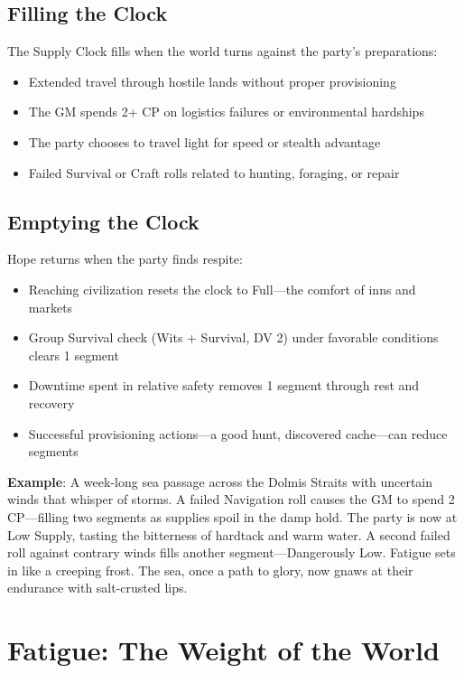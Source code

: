 \subsection*{Filling the Clock}

The Supply Clock fills when the world turns against the party's preparations:

\begin{itemize}
    \item Extended travel through hostile lands without proper provisioning
    \item The GM spends 2+ CP on logistics failures or environmental hardships
    \item The party chooses to travel light for speed or stealth advantage
    \item Failed Survival or Craft rolls related to hunting, foraging, or repair
\end{itemize}

\subsection*{Emptying the Clock}

Hope returns when the party finds respite:

\begin{itemize}
    \item Reaching civilization resets the clock to Full—the comfort of inns and markets
    \item Group Survival check (Wits + Survival, DV 2) under favorable conditions clears 1 segment
    \item Downtime spent in relative safety removes 1 segment through rest and recovery
    \item Successful provisioning actions—a good hunt, discovered cache—can reduce segments
\end{itemize}

\textbf{Example}: A week-long sea passage across the Dolmis Straits with uncertain winds that whisper of storms. A failed Navigation roll causes the GM to spend 2 CP---filling two segments as supplies spoil in the damp hold. The party is now at Low Supply, tasting the bitterness of hardtack and warm water. A second failed roll against contrary winds fills another segment---Dangerously Low. Fatigue sets in like a creeping frost. The sea, once a path to glory, now gnaws at their endurance with salt-crusted lips.

\section*{Fatigue: The Weight of the World}


